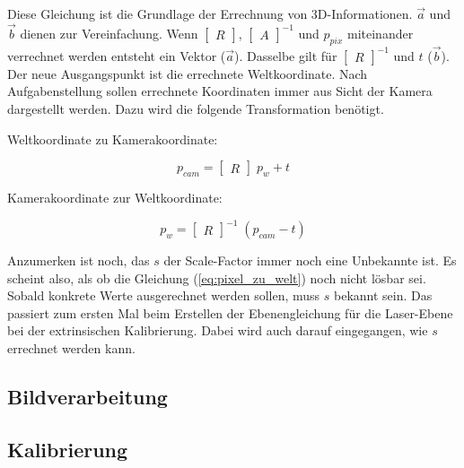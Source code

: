 		Diese Gleichung ist die Grundlage der Errechnung von 3D-Informationen. \( \vec{a} \) und \( \vec{b} \) dienen zur Vereinfachung. Wenn \( \begin{bmatrix} R \end{bmatrix} \), \( \begin{bmatrix} A \end{bmatrix}^{-1} \) und \( p_{pix} \) miteinander verrechnet werden entsteht ein Vektor (\( \vec{a} \)). Dasselbe gilt für \( \begin{bmatrix} R \end{bmatrix}^{-1} \) und \( t \) (\( \vec{b} \)). \newline
		Der neue Ausgangspunkt ist die errechnete Weltkoordinate. Nach Aufgabenstellung sollen errechnete Koordinaten immer aus Sicht der Kamera dargestellt werden. Dazu wird die folgende Transformation benötigt. 
		
		Weltkoordinate zu Kamerakoordinate:
		
		\begin{equation}
			p_{cam} = \begin{bmatrix} R \end{bmatrix} \; p_w + t
			\label{eq:welt_zu_kamera}
		\end{equation}
		
		Kamerakoordinate zur Weltkoordinate:
		
		\begin{equation}
			p_w = \begin{bmatrix} R \end{bmatrix}^{-1} \; (p_{cam} - t)
			\label{eq:kamera_zu_welt}
		\end{equation}
		
		Anzumerken ist noch, das \( s \) der Scale-Factor immer noch eine Unbekannte ist. Es scheint also, als ob die Gleichung (\ref{eq:pixel_zu_welt}) noch nicht lösbar sei. Sobald konkrete Werte ausgerechnet werden sollen, muss \( s \) bekannt sein. Das passiert zum ersten Mal beim Erstellen der Ebenengleichung für die Laser-Ebene bei der extrinsischen Kalibrierung. Dabei wird auch darauf eingegangen, wie \( s \) errechnet werden kann.  
	\subsection{Bildverarbeitung}
	
	\subsection{Kalibrierung}
